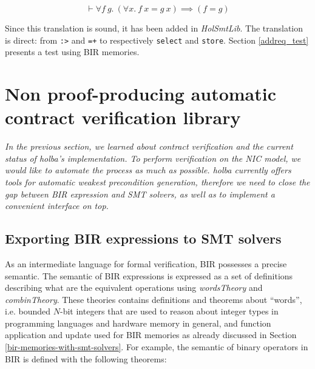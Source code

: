 \documentclass{kththesis}
\begin{document}
\begin{equation}
    \vdash \forall f~g.~(\forall x.~f~x = g~x) \implies (f = g)
    \label{bool_EQ_EXT}
\end{equation}

Since this translation is sound, it has been added in \textit{HolSmtLib}. The translation is direct: from \texttt{:>} and \texttt{=+} to respectively \texttt{select} and \texttt{store}. Section \ref{addreq_test} presents a test using BIR memories.



\chapter{Non proof-producing automatic contract verification library} \label{impl-non-pp-wp-lib}
\vspace{-1cm}
\textit{In the previous section, we learned about contract verification and the current status of \gls{holba}'s implementation. To perform verification on the \gls{NIC} model, we would like to automate the process as much as possible. \gls{holba} currently offers tools for automatic weakest precondition generation, therefore we need to close the gap between BIR expression and SMT solvers, as well as to implement a convenient interface on top.}

\section{Exporting BIR expressions to SMT solvers} \label{exporting-bir-to-smt}

As an intermediate language for formal verification, \gls{BIR} possesses a precise semantic. The semantic of BIR expressions is expressed as a set of definitions describing what are the equivalent operations using \textit{wordsTheory} and \textit{combinTheory}. These theories contains definitions and theorems about ``words'', i.e. bounded $N$-bit integers that are used to reason about integer types in programming languages and hardware memory in general, and function application and update used for BIR memories as already discussed in Section \ref{bir-memories-with-smt-solvers}. For example, the semantic of binary operators in BIR is defined with the following theorems\footnotemark:

\end{document}
